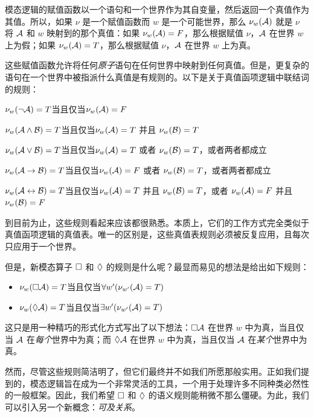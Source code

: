 模态逻辑的赋值函数以一个语句和一个世界作为其自变量，然后返回一个真值作为其值。所以，如果 $\nu$ 是一个赋值函数而 $w$ 是一个可能世界，那么 $\nu_w(\mathcal{A})$ 就是 $\nu$ 将 $\mathcal{A}$ 和 $w$ 映射到的那个真值：如果 $\nu_w(\mathcal{A})=F$，那么根据赋值 $\nu$，$\mathcal{A}$ 在世界 $w$ 上为假；如果 $\nu_w(\mathcal{A})=T$，那么根据赋值 $\nu$，$\mathcal{A}$ 在世界 $w$ 上为真。

这些赋值函数允许将任何\emph{原子}语句在任何世界中映射到任何真值。但是，更复杂的语句在一个世界中被指派什么真值是有规则的。以下是关于真值函项逻辑中联结词的规则：

\begin{compactlist}
	\item $\nu_w(\neg\mathcal{A})=T$当且仅当$\nu_w(\mathcal{A})=F$
	\item $\nu_w(\mathcal{A}\wedge\mathcal{B})=T$当且仅当$\nu_w(\mathcal{A})=T$ 并且 $\nu_w(\mathcal{B})=T$
	\item $\nu_w(\mathcal{A}\vee\mathcal{B})=T$当且仅当$\nu_w(\mathcal{A})=T$ 或者 $\nu_w(\mathcal{B})=T$，或者两者都成立
	\item $\nu_w(\mathcal{A}\rightarrow\mathcal{B})=T$当且仅当$\nu_w(\mathcal{A})=F$ 或者 $\nu_w(\mathcal{B})=T$，或者两者都成立
	\item $\nu_w(\mathcal{A}\leftrightarrow\mathcal{B})=T$当且仅当$\nu_w(\mathcal{A})=T$ 并且 $\nu_w(\mathcal{B})=T$，或者 $\nu_w(\mathcal{A})=F$ 并且 $\nu_w(\mathcal{B})=F$
\end{compactlist}

到目前为止，这些规则看起来应该都很熟悉。本质上，它们的工作方式完全类似于真值函项逻辑的真值表。唯一的区别是，这些真值表规则必须被反复应用，且每次只应用于一个世界。

但是，新模态算子 $\Box$ 和 $\Diamond$ 的规则是什么呢？最显而易见的想法是给出如下规则：

\begin{itemize}
	\item $\nu_w(\Box \mathcal{A})=T$当且仅当$\forall w' (\nu_{w'}(\mathcal{A})=T)$
	\item $\nu_w(\Diamond \mathcal{A})=T$当且仅当$\exists w' (\nu_{w'}(\mathcal{A})=T)$
\end{itemize}

这只是用一种精巧的形式化方式写出了以下想法：$\Box\mathcal{A}$ 在世界 $w$ 中为真，当且仅当 $\mathcal{A}$ 在\emph{每个}世界中为真；而 $\Diamond\mathcal{A}$ 在世界 $w$ 中为真，当且仅当 $\mathcal{A}$ 在\emph{某个}世界中为真。

然而，尽管这些规则简洁明了，但它们最终并不如我们所愿那般实用。正如我们提到的，模态逻辑旨在成为一个非常灵活的工具，一个用于处理许多不同种类必然性的一般框架。因此，我们希望 $\Box$ 和 $\Diamond$ 的语义规则能稍微不那么僵硬。为此，我们可以引入另一个新概念：\emph{可及关系}。

